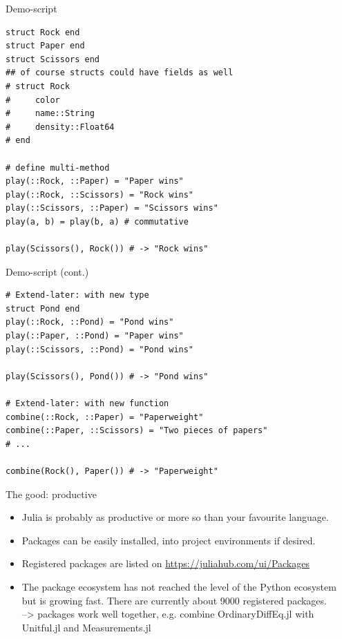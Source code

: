 \documentclass[compress,presentation,aspectratio=169]{beamer}
\begin{document}
\begin{frame}[fragile,label={sec:org7f60950}]{Demo-script}
  \footnotesize
 \begin{verbatim}
struct Rock end
struct Paper end
struct Scissors end
## of course structs could have fields as well
# struct Rock
#     color
#     name::String
#     density::Float64
# end

# define multi-method
play(::Rock, ::Paper) = "Paper wins"
play(::Rock, ::Scissors) = "Rock wins"
play(::Scissors, ::Paper) = "Scissors wins"
play(a, b) = play(b, a) # commutative

play(Scissors(), Rock()) # -> "Rock wins"
\end{verbatim}
\end{frame}

\begin{frame}[fragile,label={sec:org7f60950}]{Demo-script (cont.)}
  \footnotesize
 \begin{verbatim}
# Extend-later: with new type
struct Pond end
play(::Rock, ::Pond) = "Pond wins"
play(::Paper, ::Pond) = "Paper wins"
play(::Scissors, ::Pond) = "Pond wins"

play(Scissors(), Pond()) # -> "Pond wins"

# Extend-later: with new function
combine(::Rock, ::Paper) = "Paperweight"
combine(::Paper, ::Scissors) = "Two pieces of papers"
# ...

combine(Rock(), Paper()) # -> "Paperweight"
\end{verbatim}
\end{frame}

\begin{frame}[label={sec:orgab5838a}]{The good: productive}
  \footnotesize
\begin{itemize}
\item Julia is probably as productive or more so than your favourite language.

\item Packages can be easily installed, into project environments if
desired.

\item Registered packages are listed on \url{https://juliahub.com/ui/Packages}

\item The package ecosystem has not reached the level of the Python
ecosystem but is growing fast.  There are currently about 9000 registered
packages.\\
--> packages work well together, e.g. combine OrdinaryDiffEq.jl with
Unitful.jl and Measurements.jl
\end{itemize}
\end{frame}
\end{document}
